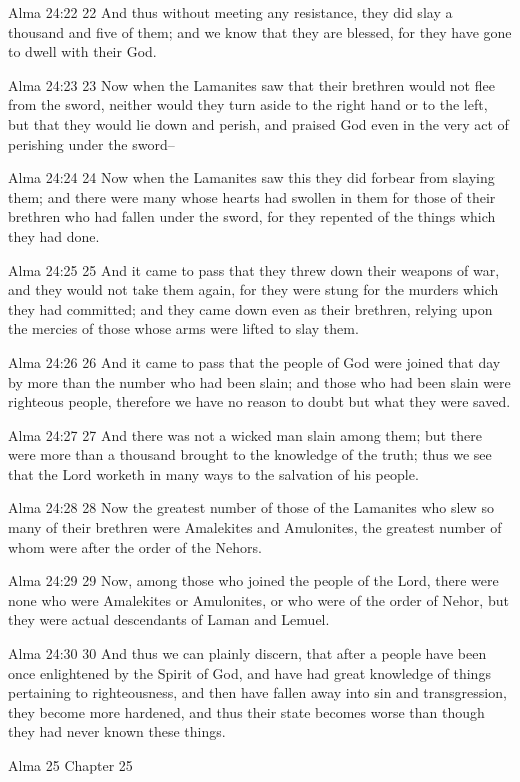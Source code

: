 Alma 24:22
 22 And thus without meeting any resistance, they did slay a
thousand and five of them; and we know that they are blessed, for
they have gone to dwell with their God.

Alma 24:23
 23 Now when the Lamanites saw that their brethren would not flee
from the sword, neither would they turn aside to the right hand
or to the left, but that they would lie down and perish, and
praised God even in the very act of perishing under the sword--

Alma 24:24
 24 Now when the Lamanites saw this they did forbear from slaying
them; and there were many whose hearts had swollen in them for
those of their brethren who had fallen under the sword, for they
repented of the things which they had done.

Alma 24:25
 25 And it came to pass that they threw down their weapons of
war, and they would not take them again, for they were stung for
the murders which they had committed; and they came down even as
their brethren, relying upon the mercies of those whose arms were
lifted to slay them.

Alma 24:26
 26 And it came to pass that the people of God were joined that
day by more than the number who had been slain; and those who had
been slain were righteous people, therefore we have no reason to
doubt but what they were saved.

Alma 24:27
 27 And there was not a wicked man slain among them; but there
were more than a thousand brought to the knowledge of the truth;
thus we see that the Lord worketh in many ways to the salvation
of his people.

Alma 24:28
 28 Now the greatest number of those of the Lamanites who slew so
many of their brethren were Amalekites and Amulonites, the
greatest number of whom were after the order of the Nehors.

Alma 24:29
 29 Now, among those who joined the people of the Lord, there
were none who were Amalekites or Amulonites, or who were of the
order of Nehor, but they were actual descendants of Laman and
Lemuel.

Alma 24:30
 30 And thus we can plainly discern, that after a people have
been once enlightened by the Spirit of God, and have had great
knowledge of things pertaining to righteousness, and then have
fallen away into sin and transgression, they become more
hardened, and thus their state becomes worse than though they had
never known these things.

Alma 25
Chapter 25

